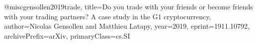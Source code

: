 @misc{gensollen2019trade,
    title={Do you trade with your friends or become friends with your trading partners? A case study in the G1 cryptocurrency},
    author={Nicolas Gensollen and Matthieu Latapy},
    year={2019},
    eprint={1911.10792},
    archivePrefix={arXiv},
    primaryClass={cs.SI}
}
